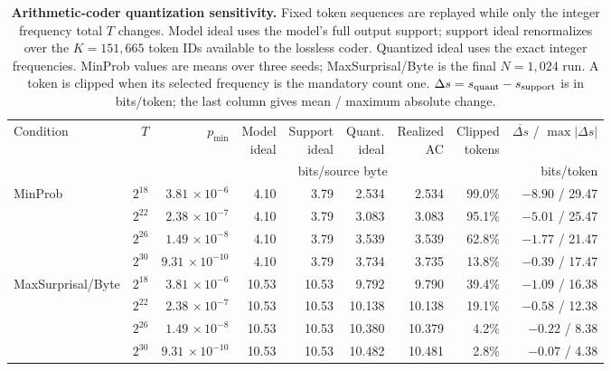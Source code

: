 \begin{table}[!htbp]
\centering
\caption{\textbf{Arithmetic-coder quantization sensitivity.} Fixed token
sequences are replayed while only the integer frequency total $T$ changes.
Model ideal uses the model's full output support; support ideal renormalizes over
the $K=151{,}665$ token IDs available to the lossless coder. Quantized ideal
uses the exact integer frequencies. MinProb values are means over three seeds;
MaxSurprisal/Byte is the final $N=1{,}024$ run. A token is clipped when its
selected frequency is the mandatory count one. $\Delta s=s_{\rm quant}-s_{\rm
support}$ is in bits/token; the last column gives mean / maximum absolute
change.}
\label{tab:quantization-sensitivity}
\scriptsize
\setlength{\tabcolsep}{1.4pt}
\begin{tabular*}{\linewidth}{@{\extracolsep{\fill}}lrrrrrrrr@{}}
\toprule
Condition & $T$ & $p_{\min}$ & \shortstack{Model\\ideal} &
\shortstack{Support\\ideal} & \shortstack{Quant.\\ideal} &
\shortstack{Realized\\AC} & \shortstack{Clipped\\tokens} &
$\overline{\Delta s}$ / $\max|\Delta s|$ \\
& & & \multicolumn{4}{c}{bits/source byte} & & bits/token \\
\midrule
MinProb & $2^{18}$ & $3.81\,\times 10^{-6}$ & 4.10 & 3.79 & 2.534 & 2.534 & 99.0\% & $-8.90$ / 29.47 \\
        & $2^{22}$ & $2.38\,\times 10^{-7}$ & 4.10 & 3.79 & 3.083 & 3.083 & 95.1\% & $-5.01$ / 25.47 \\
        & $2^{26}$ & $1.49\,\times 10^{-8}$ & 4.10 & 3.79 & 3.539 & 3.539 & 62.8\% & $-1.77$ / 21.47 \\
        & $2^{30}$ & $9.31\,\times 10^{-10}$ & 4.10 & 3.79 & 3.734 & 3.735 & 13.8\% & $-0.39$ / 17.47 \\
\midrule
MaxSurprisal/Byte & $2^{18}$ & $3.81\,\times 10^{-6}$ & 10.53 & 10.53 & 9.792 & 9.790 & 39.4\% & $-1.09$ / 16.38 \\
        & $2^{22}$ & $2.38\,\times 10^{-7}$ & 10.53 & 10.53 & 10.138 & 10.138 & 19.1\% & $-0.58$ / 12.38 \\
        & $2^{26}$ & $1.49\,\times 10^{-8}$ & 10.53 & 10.53 & 10.380 & 10.379 & 4.2\% & $-0.22$ / 8.38 \\
        & $2^{30}$ & $9.31\,\times 10^{-10}$ & 10.53 & 10.53 & 10.482 & 10.481 & 2.8\% & $-0.07$ / 4.38 \\
\bottomrule
\end{tabular*}
\end{table}
